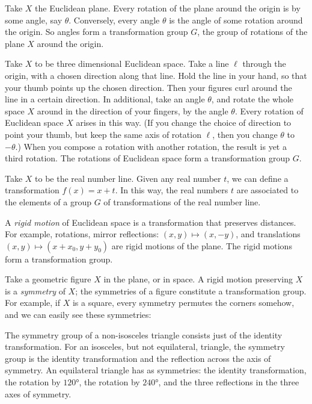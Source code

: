 \begin{example}
Take \(X\) the Euclidean plane.
Every rotation of the plane around the origin is by some angle, say \(\theta\).
Conversely, every angle \(\theta\) is the angle of some rotation around the origin.
So angles form a transformation group \(G\), the group of rotations of the plane \(X\) around the origin.
\end{example}
\begin{example}
Take \(X\) to be three dimensional Euclidean space.
Take a line \(\ell\) through the origin, with a chosen direction along that line.
Hold the line in your hand, so that your thumb points up the chosen direction.
Then your figures curl around the line in a certain direction.
In additional, take an angle \(\theta\), and rotate the whole space \(X\) around in the direction of your fingers, by the angle \(\theta\).
Every rotation of Euclidean space \(X\) arises in this way.
(If you change the choice of direction to point your thumb, but keep the same axis of rotation \(\ell\), then you change \(\theta\) to \(-\theta\).)
When you compose a rotation with another rotation, the result is yet a third rotation.
The rotations of Euclidean space form a transformation group \(G\).
\end{example}
\begin{example}
Take \(X\) to be the real number line. 
Given any real number \(t\), we can define a transformation \(f(x)=x+t\).
In this way, the real numbers \(t\) are associated to the elements of a group \(G\) of transformations of the real number line.
\end{example}
\begin{example}
A \emph{rigid motion} of Euclidean space is a transformation that preserves distances.
For example, rotations, mirror reflections: \((x,y) \mapsto (x,-y)\), and translations \((x,y) \mapsto (x+x_0,y+y_0)\) are rigid motions of the plane.
The rigid motions form a transformation group.
\end{example}
\begin{example}
Take a geometric figure \(X\) in the plane, or in space.
A rigid motion preserving \(X\) is a \emph{symmetry} of \(X\); the symmetries of a figure constitute a transformation group.
For example, if \(X\) is a square, every symmetry permutes the corners somehow, and we can easily see these symmetries:
\begin{center}

\end{center}
The symmetry group of a non-isosceles triangle consists just of the identity transformation.
For an isosceles, but not equilateral, triangle, the symmetry group is the identity transformation and the reflection across the axis of symmetry.
An equilateral triangle has as symmetries: the identity transformation, the rotation by \(120\si{\degree}\), the rotation by \(240\si{\degree}\), and the three reflections in the three axes of symmetry.
\end{example}
